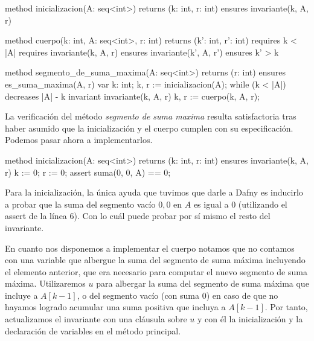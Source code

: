 \documentclass[12pt, a4paper, openany, fleqn]{book}
\begin{document}
    \begin{greenbox}
    \begin{dafny}[gobble=8]
        method inicializacion(A: seq<int>) returns (k: int, r: int)
            ensures invariante(k, A, r)

        method cuerpo(k: int, A: seq<int>, r: int) returns (k': int, r': int)
            requires k < |A|
            requires invariante(k, A, r)
            ensures invariante(k', A, r')
            ensures k' > k

        method segmento_de_suma_maxima(A: seq<int>) returns (r: int)
            ensures es_suma_maxima(A, r)
        {
            var k: int;
            k, r := inicializacion(A);
            while (k < |A|)
                decreases |A| - k
                invariant invariante(k, A, r)
            {
                k, r := cuerpo(k, A, r);
            }
        }
    \end{dafny}
    \end{greenbox}

    La verificación del método \textit{segmento de suma maxima} resulta satisfactoria tras haber asumido que la inicialización y el cuerpo cumplen con su especificación. Podemos pasar ahora a implementarlos.

    \begin{greenbox}
    \begin{dafny}[gobble=8]
        method inicializacion(A: seq<int>) returns (k: int, r: int)
            ensures invariante(k, A, r)
        {
            k := 0;
            r := 0;
            assert suma(0, 0, A) == 0;
        }
    \end{dafny}
    \end{greenbox}

    Para la inicialización, la única ayuda que tuvimos que darle a Dafny es inducirlo a probar que la suma del segmento vacío $0,0$ en $A$ es igual a 0 (utilizando el assert de la línea 6). Con lo cuál puede probar por sí mismo el resto del invariante.

    En cuanto nos disponemos a implementar el cuerpo notamos que no contamos con una variable que albergue la suma del segmento de suma máxima incluyendo el elemento anterior, que era necesario para computar el nuevo segmento de suma máxima.
    Utilizaremos $u$ para albergar la suma del segmento de suma máxima que incluye a $A[k-1]$, o del segmento vacío (con suma $0$) en caso de que no hayamos logrado acumular una suma positiva que incluya a $A[k-1]$. Por tanto, actualizamos el invariante con una cláusula sobre $u$ y con él la inicialización y la declaración de variables en el método principal.
\end{document}
